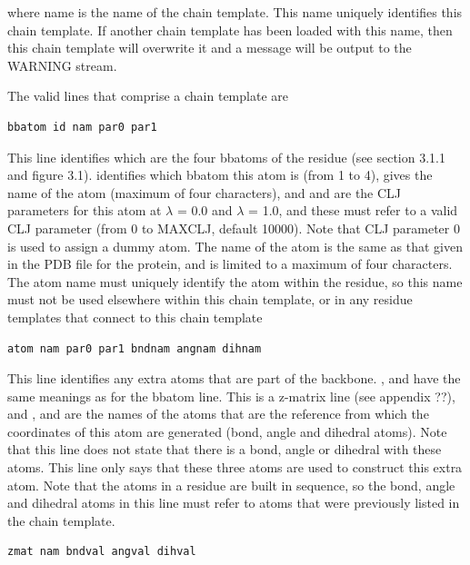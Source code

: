 \documentclass[letterpaper,10pt,english]{sphinxmanual}
\begin{document}
where name is the name of the chain template. This name uniquely identifies this chain template. If another chain template has been loaded with this name, then this chain template will overwrite it and a message will be output to the WARNING stream.

The valid lines that comprise a chain template are

\begin{Verbatim}[commandchars=\\\{\}]
bbatom id nam par0 par1
\end{Verbatim}

This line identifies which are the four bbatoms of the residue (see section 3.1.1 and figure 3.1).  identifies which bbatom this atom is (from 1 to 4),  gives the name of the atom (maximum of four characters), and  and  are the CLJ parameters for this atom at \(\lambda\) = 0.0 and \(\lambda\) = 1.0, and these must refer to a valid CLJ parameter (from 0 to MAXCLJ, default 10000). Note that CLJ parameter 0 is used to assign a dummy atom. The name of the atom is the same as that given in the PDB file for the protein, and is limited to a maximum of four characters. The atom name must uniquely identify the atom within the residue, so this name must not be used elsewhere within this chain template, or in any residue templates that connect to this chain template

\begin{Verbatim}[commandchars=\\\{\}]
atom nam par0 par1 bndnam angnam dihnam
\end{Verbatim}

This line identifies any extra atoms that are part of the backbone. ,  and  have the same meanings as for the bbatom line. This is a z-matrix line (see appendix ??), and ,  and  are the names of the atoms that are the reference from which the coordinates of this atom are generated (bond, angle and dihedral atoms). Note that this line does not state that there is a bond, angle or dihedral with these atoms. This line only says that these three atoms are used to construct this extra atom. Note that the atoms in a residue are built in sequence, so the bond, angle and dihedral atoms in this line must refer to atoms that were previously listed in the chain template.

\begin{Verbatim}[commandchars=\\\{\}]
zmat nam bndval angval dihval
\end{Verbatim}
\end{document}
